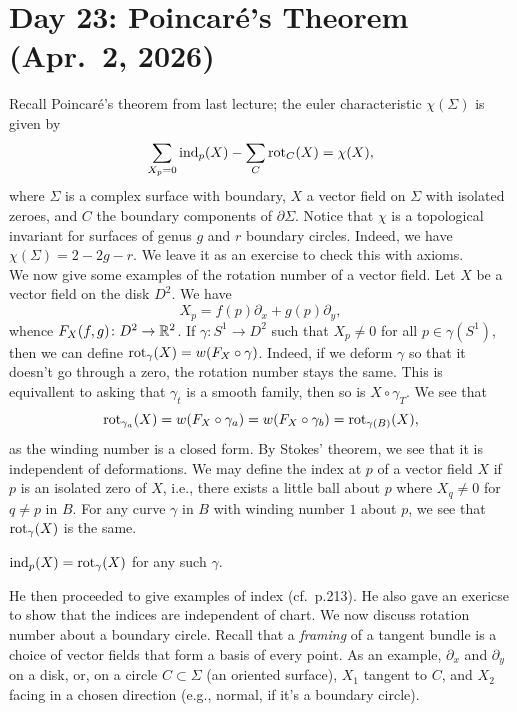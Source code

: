 \section{Day 23: Poincar\'e's Theorem (Apr.\ 2, 2026)}
Recall Poincar\'e's theorem from last lecture; the euler characteristic $\chi(\Sigma)$ is given by
\[ \sum_{X_p = 0} \operatorname{ind}_p(X) - \sum_{C} \operatorname{rot}_C(X) = \chi(X), \]
where $\Sigma$ is a complex surface with boundary, $X$ a vector field on $\Sigma$ with isolated zeroes, and $C$ the boundary components of $\partial \Sigma$. Notice that $\chi$ is a topological invariant for surfaces of genus $g$ and $r$ boundary circles. Indeed, we have $\chi(\Sigma) = 2 - 2g - r$. We leave it as an exercise to check this with axioms.
\\[8pt]
We now give some examples of the rotation number of a vector field. Let $X$ be a vector field on the disk $D^2$. We have
\[ X_p = f(p) \partial_x + g(p) \partial_y, \]
whence $F_X(f, g) \colon D^2 \to \mathbb R^2$. If $\gamma \colon S^1 \to D^2$ such that $X_p \neq 0$ for all $p \in \gamma(S^1)$, then we can define $\operatorname{rot}_\gamma(X) = w(F_X \circ \gamma)$. Indeed, if we deform $\gamma$ so that it doesn't go through a zero, the rotation number stays the same. This is equivallent to asking that $\gamma_t$ is a smooth family, then so is $X \circ \gamma_T$. We see that
\[ \operatorname{rot}_{\gamma_a}(X) = w(F_X \circ \gamma_a) = w(F_X \circ \gamma_b) = \operatorname{rot}_{\gamma(B)}(X), \]
as the winding number is a closed form. By Stokes' theorem, we see that it is independent of deformations. We may define the index at $p$ of a vector field $X$ if $p$ is an isolated zero of $X$, i.e., there exists a little ball about $p$ where $X_q \neq 0$ for $q \neq p$ in $B$. For any curve $\gamma$ in $B$ with winding number $1$ about $p$, we see that $\operatorname{rot}_\gamma(X)$ is the same.
\begin{definition}
    $\operatorname{ind}_p(X) = \operatorname{rot}_{\gamma}(X)$ for any such $\gamma$.
\end{definition}
He then proceeded to give examples of index (cf.\ p.213). He also gave an exericse to show that the indices are independent of chart. We now discuss rotation number about a boundary circle. Recall that a \textit{framing} of a tangent bundle is a choice of vector fields that form a basis of every point. As an example, $\partial_x$ and $\partial_y$ on a disk, or, on a circle $C \subset \Sigma$ (an oriented surface), $X_1$ tangent to $C$, and $X_2$ facing in a chosen direction (e.g., normal, if it's a boundary circle).
\\[8pt]
